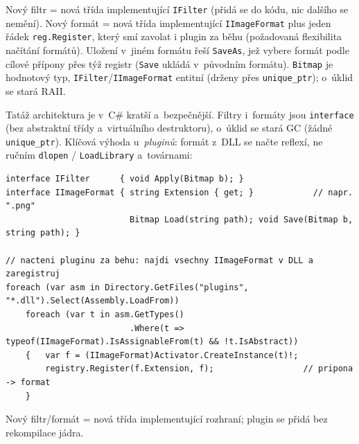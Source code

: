 Nový filtr = nová třída implementující \texttt{IFilter} (přidá se do kódu, nic dalšího se nemění). Nový formát = nová třída implementující \texttt{IImageFormat} plus jeden řádek \texttt{reg.Register}, který smí zavolat i plugin za běhu (požadovaná flexibilita načítání formátů). Uložení v~jiném formátu řeší \texttt{SaveAs}, jež vybere formát podle cílové přípony přes týž registr (\texttt{Save} ukládá v~původním formátu). \texttt{Bitmap} je hodnotový typ, \texttt{IFilter}/\texttt{IImageFormat} entitní (drženy přes \texttt{unique\_ptr}); o~úklid se stará RAII.

\medskip
\begin{csalt}
Tatáž architektura je v~C\# kratší a~bezpečnější. Filtry i~formáty jsou \texttt{interface}
(bez abstraktní třídy a~virtuálního destruktoru), o~úklid se stará GC (žádné \texttt{unique\_ptr}).
Klíčová výhoda u~\emph{pluginů}: formát z~DLL se načte reflexí, ne ručním \texttt{dlopen} /
\texttt{LoadLibrary} a~továrnami:
\begin{lstlisting}[style=cs]
interface IFilter      { void Apply(Bitmap b); }
interface IImageFormat { string Extension { get; }            // napr. ".png"
                         Bitmap Load(string path); void Save(Bitmap b, string path); }

// nacteni pluginu za behu: najdi vsechny IImageFormat v DLL a zaregistruj
foreach (var asm in Directory.GetFiles("plugins", "*.dll").Select(Assembly.LoadFrom))
    foreach (var t in asm.GetTypes()
                         .Where(t => typeof(IImageFormat).IsAssignableFrom(t) && !t.IsAbstract))
    {   var f = (IImageFormat)Activator.CreateInstance(t)!;
        registry.Register(f.Extension, f);                  // pripona -> format
    }
\end{lstlisting}
Nový filtr/formát = nová třída implementující rozhraní; plugin se přidá bez rekompilace jádra.
\end{csalt}
